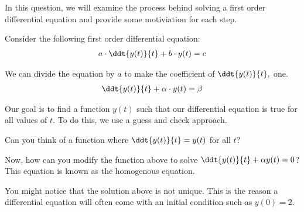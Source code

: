 
In this question, we will examine the process behind solving a 
first order differential equation and provide some motiviation for each step.

Consider the following first order differential equation:
\begin{align}
a \cdot \ddt{y(t)}{t} + b \cdot y(t) = c
\end{align}

We can divide the equation by $a$ to make the coefficient of $\ddt{y(t)}{t},$ one.
\begin{align}
\ddt{y(t)}{t} + \alpha \cdot y(t) = \beta
\end{align}

Our goal is to find a function $y(t)$ such that our differential equation 
is true for all values of $t.$
To do this, we use a guess and check approach.


\begin{enumerate}

\qitem Can you think of a function where $\ddt{y(t)}{t} = y(t)$ for all $t$?


\qitem Now, how can you modify the function above to solve 
$\ddt{y(t)}{t} + \alpha y(t) = 0$?
This equation is known as the homogenous equation.


\end{enumerate}

You might notice that the solution above is not unique.
This is the reason a differential equation will often come 
with an initial condition such as $y(0) = 2$.

